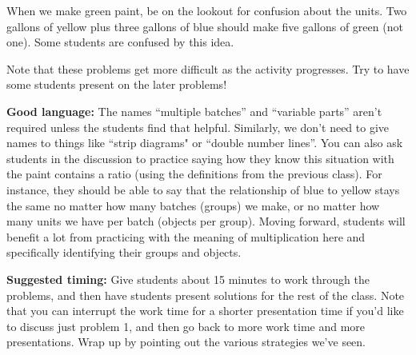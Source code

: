 \documentclass{ximera}
\begin{document}
\begin{instructorNotes}
When we make green paint, be on the lookout for confusion about the units. Two gallons of yellow plus three gallons of blue should make five gallons of green (not one). Some students are confused by this idea.

Note that these problems get more difficult as the activity progresses. Try to have some students present on the later problems!


{\bf Good language:} The names ``multiple batches'' and ``variable parts'' aren't required unless the students find that helpful. Similarly, we don't need to give names to things like ``strip diagrams" or ``double number lines''.  You can also ask students in the discussion to practice saying how they know this situation with the paint contains a ratio (using the definitions from the previous class). For instance, they should be able to say that the relationship of blue to yellow stays the same no matter how many batches (groups) we make, or no matter how many units we have per batch (objects per group).  Moving forward, students will benefit a lot from practicing with the meaning of multiplication here and specifically identifying their groups and objects. 

{\bf Suggested timing:} Give students about 15 minutes to work through the problems, and then have students present solutions for the rest of the class.  Note that you can interrupt the work time for a shorter presentation time if you'd like to discuss just problem 1, and then go back to more work time and more presentations. Wrap up by pointing out the various strategies we've seen.
\end{instructorNotes}
\end{document}
